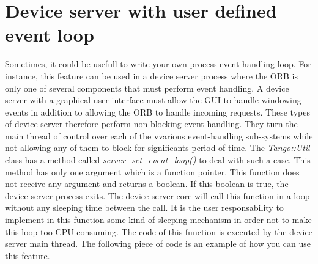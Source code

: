 \section{Device server with user defined event loop}

Sometimes, it could be usefull to write your own process event handling
loop. For instance, this feature can be used in
a device server process where the ORB is only one of several components
that must perform event handling. A device server with a graphical
user interface must allow the GUI to handle windowing events in addition
to allowing the ORB to handle incoming requests. These types of device
server therefore perform non-blocking event handling. They turn the
main thread of control over each of the vvarious event-handling sub-systems
while not allowing any of them to block for significants period of
time. The \emph{Tango::Util} class has a method called \emph{server\_set\_event\_loop()}
to deal with such a case. This method has only one argument which
is a function pointer. This function does not receive any argument
and returns a boolean. If this boolean is true, the device server
process exits. The device server core will call this function in a
loop without any sleeping time between the call. It is the user responsability
to implement in this function some kind of sleeping mechanism in order
not to make this loop too CPU consuming. The code of this function
is executed by the device server main thread. The following
piece of code is an example of how you can use this feature.



